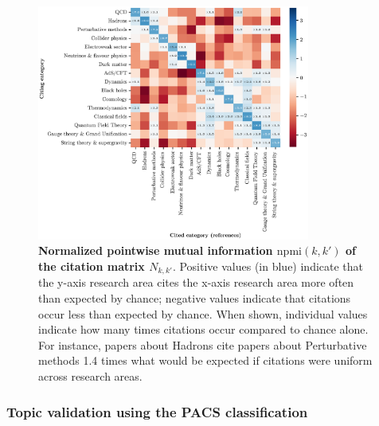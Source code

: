 \documentclass{article}
\begin{document}
\begin{figure}[H]
    \centering
    \includegraphics[width=0.8\textwidth]{Fig10.eps}
    \caption{\textbf{Normalized pointwise mutual information $\mathrm{npmi}(k,k')$ of the citation matrix $N_{k,k'}$}. Positive values (in blue) indicate that the y-axis research area cites the x-axis research area more often than expected by chance; negative values indicate that citations occur less than expected by chance. When shown, individual values indicate how many times citations occur compared to chance alone. For instance, papers about Hadrons cite papers about Perturbative methods 1.4 times what would be expected if citations were uniform across research areas.}
    \label{fig:topic_citation_matrix}
\end{figure}

\subsubsection{\label{appendix:pacs_validation}Topic validation using the PACS classification}
\end{document}
